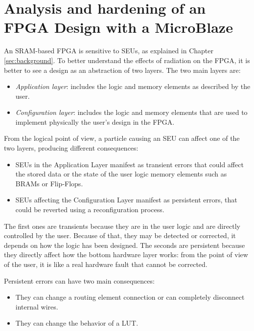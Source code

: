 \nocite{book}
\nocite{nasa_le}

\chapter{Analysis and hardening of an FPGA Design with a MicroBlaze}
\label{sec:main}

An SRAM-based FPGA is sensitive to SEUs, as explained in Chapter \ref{sec:background}. To better understand the effects of radiation on the FPGA, it is better to see a design as an abstraction of two layers. The two main layers are:

\begin{itemize}
    \item \textit{Application layer}: includes the logic and memory elements as described by the user.
    \item \textit{Configuration layer}: includes the logic and memory elements that are used to implement physically the user's design in the FPGA.
\end{itemize}

From the logical point of view, a particle causing an SEU can affect one of the two layers, producing different consequences:

\begin{itemize}
    \item SEUs in the Application Layer manifest as transient errors that could affect the stored data or the state of the user logic memory elements such as BRAMs or Flip-Flops. 
    \item SEUs affecting the Configuration Layer manifest as persistent errors, that could be reverted using a reconfiguration process. 
\end{itemize}

The first ones are transients because they are in the user logic and are directly controlled by the user. Because of that, they may be detected or corrected, it depends on how the logic has been designed. The seconds are persistent because they directly affect how the bottom hardware layer works: from the point of view of the user, it is like a real hardware fault that cannot be corrected. \bigskip

Persistent errors can have two main consequences:

\begin{itemize}
    \item They can change a routing element connection or can completely disconnect internal wires.
    \item They can change the behavior of a LUT.
\end{itemize}

